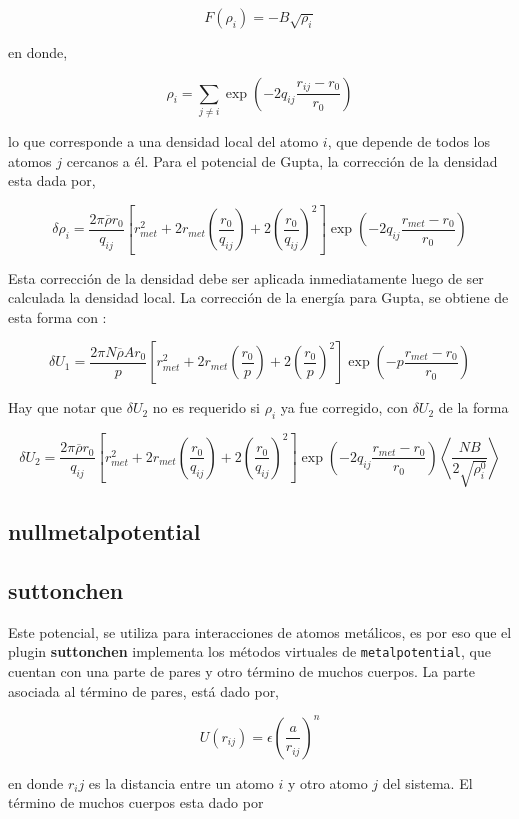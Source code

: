 $$F(\rho_{i}) = -B\sqrt{\rho_i}$$

en donde,

$$\rho_i = \sum_{j\neq i} \exp{\left(-2q_{ij}\frac{r_{ij}-r_0}{r_0}\right)}$$

lo que corresponde a una densidad local del atomo $i$, que depende de todos los
atomos $j$ cercanos a \'el. Para el potencial de Gupta, la correcci\'on de la
densidad esta dada por,

$$\delta\rho_i=\frac{2\pi\overline{\rho}r_0}{q_{ij}}\left[r^2_{met}+2r_{met}
\left(\frac{r_0}{q_{ij}}\right)+2\left(\frac{r_0}{q_{ij}}\right)^2\right]\exp{
\left(-2q_{ij}\frac{r_{met}-r_0}{r_0}\right)}$$

Esta correcci\'on de la densidad debe ser aplicada inmediatamente luego de ser
calculada la densidad local. La correcci\'on de la energ\'ia para Gupta, se
obtiene de esta forma con :

$$\delta U_1 = \frac{2\pi N\overline{\rho}A
r_0}{p}\left[r^2_{met}+2r_{met}\left(\frac{r_0}{p}\right)+2\left(\frac{r_0}{p}
\right)^2\right]\exp{\left(-p\frac{r_{met}-r_0}{r_0}\right)}$$

Hay que notar que $\delta U_2$ no es requerido si $\rho_i$ ya fue corregido, con
$\delta U_2$ de la forma

$$\delta U_2 = \frac{2\pi\overline{\rho}
r_0}{q_{ij}}\left[r^2_{met}+2r_{met}\left(\frac{r_0}{q_{ij}}\right)+2\left(\frac
{r_0}{q_{ij}}\right)^2\right]\exp{\left(-2q_{ij}\frac{r_{met}-r_0}{r_0}\right)}
\left<\frac{NB}{2\sqrt{\rho_i^0}}\right>$$

\subsection{nullmetalpotential}

\subsection{suttonchen}
Este potencial, se utiliza para interacciones de atomos met\'alicos, es por eso
que el plugin \textbf{suttonchen} implementa los m\'etodos virtuales de
\verb|metalpotential|, que cuentan con una parte de pares y otro t\'ermino de
muchos cuerpos. La parte asociada al t\'ermino de pares, est\'a dado por,

$$U(r_{ij}) = \epsilon\left(\frac{a}{r_{ij}}\right)^n$$

en donde $r_ij$ es la distancia entre un atomo $i$ y otro atomo $j$ del sistema.
El t\'ermino de muchos cuerpos esta dado por

